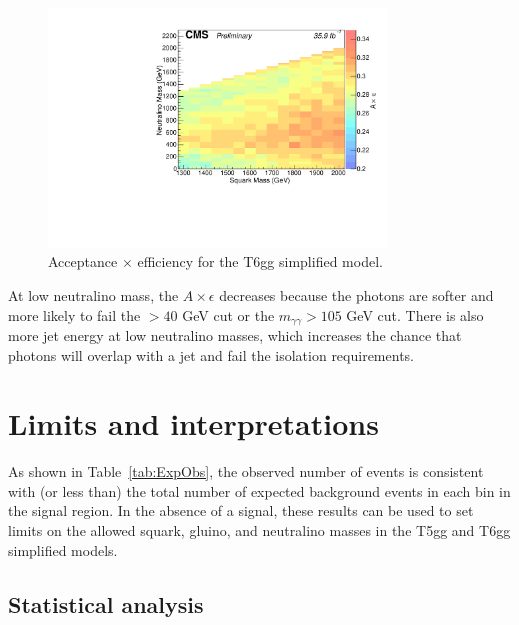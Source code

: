 \begin{figure}[h]
\begin{center}
\includegraphics[width=0.8\textwidth]{Figures/Results/accXeff_T6gg.pdf}
\end{center}
    \caption{Acceptance $\times$ efficiency for the T6gg simplified model.}
    \label{fig:accXeff_T6gg}
\end{figure}


At low neutralino mass, the $A \times \epsilon$ decreases because the photons are softer and more likely to fail the \pT $> 40$ GeV cut or the 
$m_{\gamma\gamma} > 105$ GeV cut.
There is also more jet energy at low neutralino masses, which increases the chance that photons will overlap with a jet and fail the 
isolation requirements.



\section{Limits and interpretations}
\label{sec:limits}

As shown in Table~\ref{tab:ExpObs}, the observed number of events is consistent with (or less than) the total number of 
expected background events in each bin in the signal region. In the absence of a signal, these results can 
be used to set limits on the allowed squark, gluino, and neutralino masses in the T5gg and T6gg simplified models.

\subsection{Statistical analysis}
\label{sec:stats}

